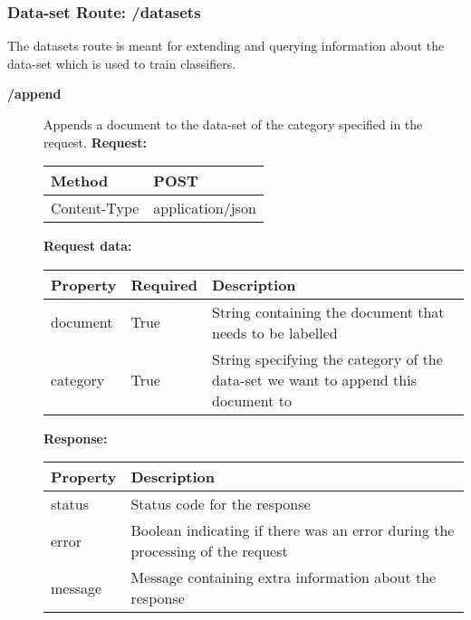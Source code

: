 \subsubsection{Data-set Route: /datasets}
The datasets route is meant for extending and querying information about the data-set which is used to train classifiers. 

\begin{description}


\item [\textbf{/append}]
Appends a document to the data-set of the category specified in the request.
\newline
\newline
\textbf{Request:}
\newline
\newline
\begin{tabular}{ | l | l |}
\hline
Method & POST\\ \hline
Content-Type & application/json\\ \hline
\end{tabular}
\newline
\newline
\textbf{Request data:}
\newline
\newline
\resizebox{\textwidth}{!} {
\begin{tabular}{ | l | l | l |}
\hline
\textbf{Property} & \textbf{Required} & \textbf{Description}\\ \hline
document & True & String containing the document that needs to be labelled\\ \hline
category & True & String specifying the category of the data-set we want to append this document to\\ \hline
\end{tabular}}
\newline
\newline
\textbf{Response:}
\newline
\newline
\resizebox{\textwidth}{!} {
\begin{tabular}{ | l | l |}
\hline
\textbf{Property} & \textbf{Description}\\ \hline
status & Status code for the response\\ \hline
error & Boolean indicating if there was an error during the processing of the request\\ \hline
message & Message containing extra information about the response\\ \hline
\end{tabular}}



\end{description}
